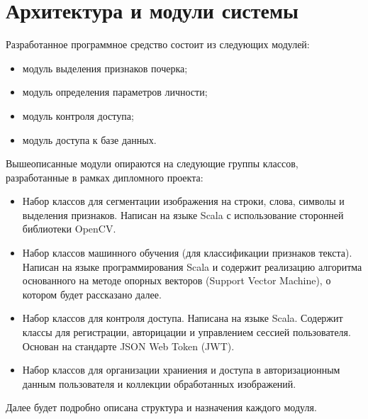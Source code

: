 \section{Архитектура и модули системы}

Разработанное программное средство состоит из следующих модулей:
\begin{itemize}
    \item модуль выделения признаков почерка;
    \item модуль определения параметров личности;
    \item модуль контроля доступа;
    \item модуль доступа к базе данных.
\end{itemize}

Вышеописанные модули опираются на следующие группы классов, разработанные в рамках дипломного проекта:
\begin{itemize}
    \item Набор классов для сегментации изображения на строки, слова, символы и выделения признаков. Написан на языке Scala с использование сторонней библиотеки OpenCV.
    \item Набор классов машинного обучения (для классификации признаков текста). Написан на языке программирования Scala и содержит реализацию алгоритма основанного на методе опорных векторов (Support Vector Machine), о котором будет рассказано далее.
    \item Набор классов для контроля доступа. Написана на языке Scala. Содержит классы для регистрации, авторицации и управлением сессией пользователя. Основан на стандарте JSON Web Token (JWT).
    \item Набор классов для организации храниения и доступа в авторизационным данным пользователя и коллекции обработанных изображений.
\end{itemize}

Далее будет подробно описана структура и назначения каждого модуля.


